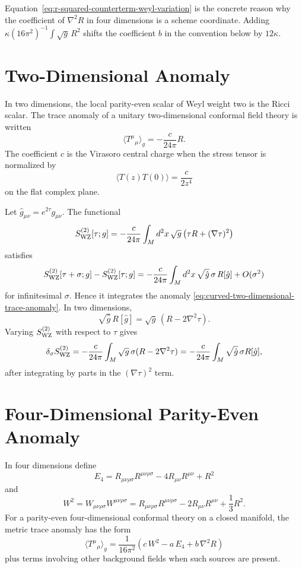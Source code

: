 Equation~\eqref{eq:r-squared-counterterm-weyl-variation} is the concrete
reason why the coefficient of \(\nabla^2R\) in four dimensions is a scheme
coordinate.  Adding \(\kappa(16\pi^2)^{-1}\int\sqrt g\,R^2\) shifts the
coefficient \(b\) in the convention below by \(12\kappa\).

\section{Two-Dimensional Anomaly}

In two dimensions, the local parity-even scalar of Weyl weight two is the
Ricci scalar.  The trace anomaly of a unitary two-dimensional conformal field
theory is written
\begin{equation}
  \langle T^\mu{}_\mu\rangle_g
  =
  -\frac{c}{24\pi}R .
  \label{eq:curved-two-dimensional-trace-anomaly}
\end{equation}
The coefficient \(c\) is the Virasoro central charge when the stress tensor
is normalized by
\[
  \langle T(z)T(0)\rangle=\frac{c}{2z^4}
\]
on the flat complex plane.

Let \(\hat g_{\mu\nu}=e^{2\tau}g_{\mu\nu}\).  The functional
\[
  S_{\rm WZ}^{(2)}[\tau;g]
  =
  -\frac{c}{24\pi}
  \int_M d^2x\,\sqrt g\,\bigl(\tau R+(\nabla\tau)^2\bigr)
\]
satisfies
\[
  S_{\rm WZ}^{(2)}[\tau+\sigma;g]
  -
  S_{\rm WZ}^{(2)}[\tau;g]
  =
  -\frac{c}{24\pi}
  \int_M d^2x\,\sqrt{\hat g}\,\sigma\,R[\hat g]
  +O(\sigma^2)
\]
for infinitesimal \(\sigma\).  Hence it integrates the anomaly
\eqref{eq:curved-two-dimensional-trace-anomaly}.
In two dimensions,
\[
  \sqrt{\hat g}\,R[\hat g]
  =
  \sqrt g\,(R-2\nabla^2\tau).
\]
Varying \(S_{\rm WZ}^{(2)}\) with respect to \(\tau\) gives
\[
  \delta_\sigma S_{\rm WZ}^{(2)}
  =
  -\frac{c}{24\pi}
  \int_M\sqrt g\,\sigma(R-2\nabla^2\tau)
  =
  -\frac{c}{24\pi}
  \int_M\sqrt{\hat g}\,\sigma R[\hat g],
\]
after integrating by parts in the \((\nabla\tau)^2\) term.

\section{Four-Dimensional Parity-Even Anomaly}

In four dimensions define
\[
  E_4
  =
  R_{\mu\nu\rho\sigma}R^{\mu\nu\rho\sigma}
  -4R_{\mu\nu}R^{\mu\nu}
  +R^2
\]
and
\[
  W^2
  =
  W_{\mu\nu\rho\sigma}W^{\mu\nu\rho\sigma}
  =
  R_{\mu\nu\rho\sigma}R^{\mu\nu\rho\sigma}
  -2R_{\mu\nu}R^{\mu\nu}
  +\frac13R^2 .
\]
For a parity-even four-dimensional conformal theory on a closed manifold,
the metric trace anomaly has the form
\begin{equation}
  \langle T^\mu{}_\mu\rangle_g
  =
  \frac{1}{16\pi^2}
  \left(
  c\,W^2-a\,E_4+b\,\nabla^2R
  \right)
  \label{eq:curved-four-dimensional-trace-anomaly}
\end{equation}
plus terms involving other background fields when such sources are present.

